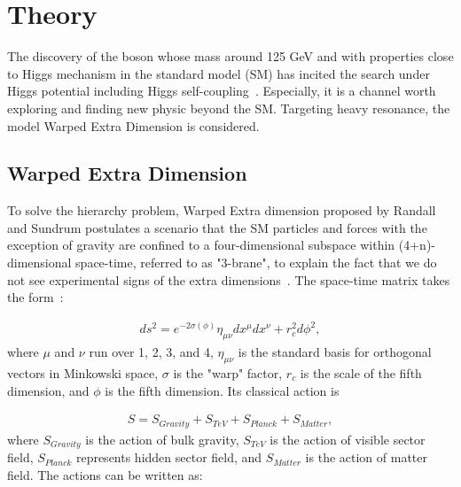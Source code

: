 \section{Theory}

The discovery of the boson whose mass around 125 GeV and with properties close to Higgs mechanism in the standard model (SM) has incited the search under Higgs potential including Higgs self-coupling~\citep{jetarea_fastjet_pu,HiggsdiscoveryAtlas}. Especially, it is a channel worth exploring and finding new physic beyond the SM. 
Targeting heavy resonance, the model Warped Extra Dimension is considered. 

\subsection{Warped Extra Dimension} 

To solve the hierarchy problem, Warped Extra dimension proposed by Randall and Sundrum postulates a scenario that the SM particles and forces with the exception of gravity are confined to a four-dimensional subspace within (4+n)-dimensional space-time, referred to as "3-brane", 
to explain the fact that we do not see experimental signs of the extra dimensions~\citep{Randall:1999ee}.  The space-time matrix takes the form~\citep{Oliveira:2014kla}:

\begin{equation} 
\begin{split}
ds^2 = e^{-2\sigma(\phi)}\eta_{\mu\nu}dx^{\mu}dx^{\nu} + r^2_{c}d\phi^2, 
\end{split}
\end{equation}
where $\mu$ and $\nu$ run over 1, 2, 3, and 4, $\eta_{\mu\nu}$ is the standard basis for orthogonal vectors in Minkowski space, $\sigma$ is the "warp" factor, $r_{c}$ is the scale of the fifth dimension, and $\phi$ is the fifth dimension. Its classical action is 

\begin{equation}
\begin{split}
S = S_{Gravity}+S_{TeV}+S_{Planck}+S_{Matter},
\end{split}
\end{equation}
where $S_{Gravity}$ is the action of bulk gravity, $S_{TeV}$ is the action of visible sector field, $S_{Planck}$ represents hidden sector field, and $S_{Matter}$ is the action of matter field. The actions can be written as:

